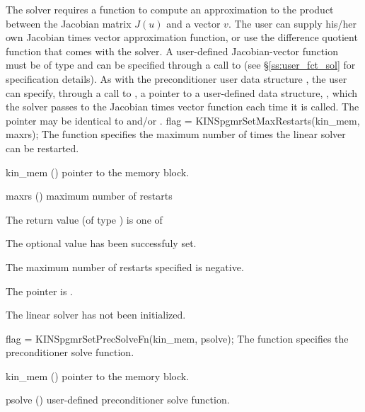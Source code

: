 The 
{\kinspgmr} solver requires a function to compute an approximation to the
product between the Jacobian matrix $J(u)$ and a vector $v$.
The user can supply his/her own Jacobian times vector approximation function, 
or use the difference quotient function  
that comes with the {\kinspgmr} solver.
A user-defined Jacobian-vector function must be of type  and 
can be specified through a call to  
(see \S\ref{ss:user_fct_sol} for specification details).
As with the preconditioner user data structure , 
the user can specify, through a call to , a pointer to a 
user-defined data structure, , which
the {\kinspgmr} solver passes to the Jacobian times vector function  each
time it is called.  
The pointer  may be identical to  and/or .
{
  flag = KINSpgmrSetMaxRestarts(kin\_mem, maxrs);
}
{
  The function  specifies the maximum
  number of times the {\spgmr} linear solver can be restarted.
}
{
  \begin{args}
  \item[kin\_mem] ()
    pointer to the {\kinsol} memory block.
  \item[maxrs] ()
    maximum number of restarts
  \end{args}
}
{
  The return value  (of type ) is one of
  \begin{args}
  \item[\Id{KINSPGMR\_SUCCESS}] 
    The optional value has been successfuly set.
  \item[\Id{KINSPGMR\_ILL\_INPUT}]
    The maximum number of restarts specified is negative.
  \item[\Id{KINSPGMR\_MEM\_NULL}]
    The  pointer is .
  \item[\Id{KINSPGMR\_LMEM\_NULL}]
    The {\kinspgmr} linear solver has not been initialized.
  \end{args}
}
{}
{
  flag = KINSpgmrSetPrecSolveFn(kin\_mem, psolve);
}
{
  The function  specifies the preconditioner
  solve function.
}
{
  \begin{args}
  \item[kin\_mem] ()
    pointer to the {\kinsol} memory block.
  \item[psolve] ()
    user-defined preconditioner solve function.
  \end{args}
}

